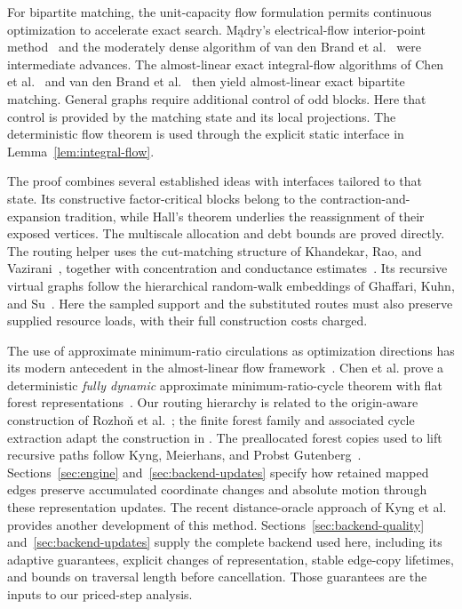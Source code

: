 For bipartite matching, the unit-capacity flow formulation permits
continuous optimization to accelerate exact search. M\k{a}dry's
electrical-flow interior-point method~\cite{Madry2013CentralPath} and
the moderately dense algorithm of van den Brand
et al.~\cite{vanDenBrandEtAl2020BipartiteMatching} were intermediate
advances. The almost-linear exact integral-flow algorithms of Chen
et al.~\cite{FlowRandomized} and van den Brand
et al.~\cite{FlowDeterministic} then yield almost-linear exact bipartite
matching. General graphs require additional control of odd blocks.
Here that control is provided by the matching state and its local
projections. The deterministic flow theorem is used through the
explicit static interface in Lemma~\ref{lem:integral-flow}.

The proof combines several established ideas with interfaces tailored
to that state. Its constructive factor-critical blocks belong to the
contraction-and-expansion tradition, while Hall's theorem underlies
the reassignment of their exposed vertices. The multiscale allocation
and debt bounds are proved directly. The routing helper uses the
cut-matching structure of Khandekar, Rao, and
Vazirani~\cite{KhandekarRaoVazirani2006}, together with concentration
and conductance estimates~\cite{TroppBernstein,SinclairJerrum1989}.
Its recursive virtual graphs follow the hierarchical random-walk
embeddings of Ghaffari, Kuhn, and Su~\cite[Section~3.1.2]{GhaffariKuhnSu2017}.
Here the sampled support and the substituted routes must also preserve
supplied resource loads, with their full construction costs charged.

The use of approximate minimum-ratio circulations as optimization
directions has its modern antecedent in the almost-linear flow
framework~\cite{FlowRandomized,FlowDeterministic}. Chen et al.
prove a deterministic \emph{fully dynamic} approximate
minimum-ratio-cycle theorem with flat forest
representations~\cite[Definition~2.3 and Theorem~3.5]{IncrementalGraphs}.
Our routing hierarchy is related to the origin-aware construction of
Rozho\v{n} et al.~\cite{MinorAggregateRouting}; the finite forest family
and associated cycle extraction adapt the construction in
\cite[Section~4.5]{IncrementalGraphs}. The preallocated forest copies used
to lift recursive paths follow Kyng, Meierhans, and Probst
Gutenberg~\cite[Section~3.3, Lemma~3.21 and Algorithm~5]{KyngMeierhansProbstGutenberg2023FlatForest}.
Sections~\ref{sec:engine} and~\ref{sec:backend-updates} specify how retained
mapped edges preserve accumulated coordinate changes and absolute motion
through these representation updates. The recent distance-oracle
approach of Kyng et al.~\cite{MinRatioDistanceOracles2026} provides
another development of this method. Sections~\ref{sec:backend-quality}
and~\ref{sec:backend-updates} supply the complete backend used here,
including its adaptive guarantees, explicit changes of representation,
stable edge-copy lifetimes, and bounds on traversal length before
cancellation. Those guarantees are the inputs to our priced-step
analysis.

